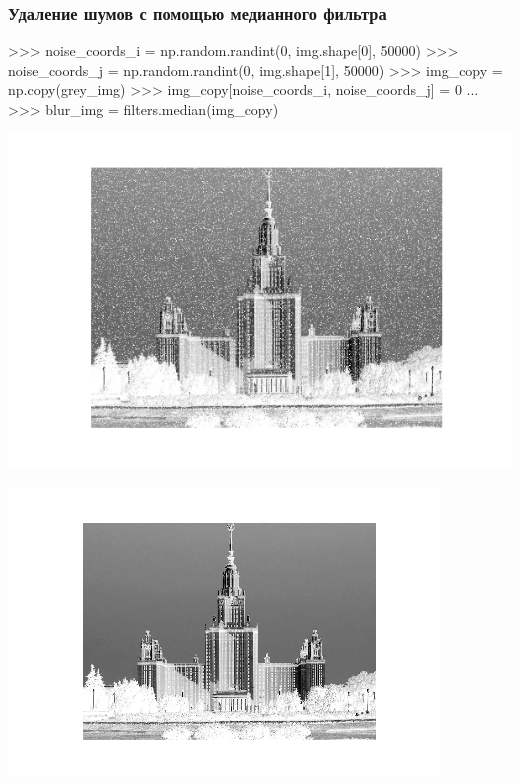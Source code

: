 \documentclass[fleqn, xcolor=x11names]{beamer}
\begin{document}
\begin{frame}[fragile]\frametitle{Удаление шумов с помощью медианного фильтра}
\begin{pcode}
>>> noise_coords_i = np.random.randint(0, img.shape[0], 50000)
>>> noise_coords_j = np.random.randint(0, img.shape[1], 50000)
>>> img_copy = np.copy(grey_img)
>>> img_copy[noise_coords_i, noise_coords_j] = 0
...
>>> blur_img = filters.median(img_copy)
\end{pcode}

\begin{minipage}{0.49\linewidth}
\includegraphics[scale=0.4]{images/img_noize.png}
\end{minipage}
\begin{minipage}{0.49\linewidth}
\includegraphics[scale=0.4]{images/img_median.png}
\end{minipage}
\end{frame}
\end{document}
